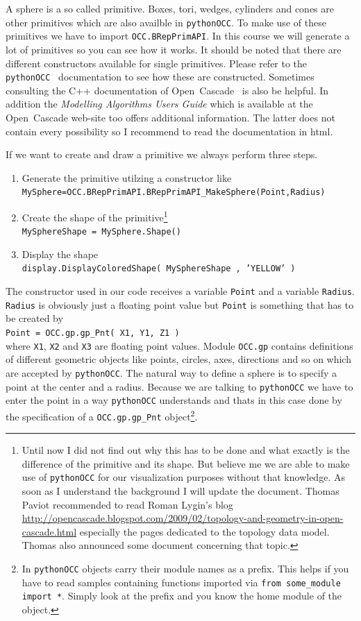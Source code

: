 A sphere is a so called primitive.
Boxes, tori, wedges, cylinders and cones are other primitives which are also availble in {\tt pythonOCC}.
To make use of these primitives we have to import {\tt OCC.BRepPrimAPI}.
In this course we will generate a lot of primitives so you can see how it works.
It should be noted that there are different constructors available for single primitives.
Please refer to the {\tt pythonOCC}~\cite{PYTHON_OCC_DOCU} documentation to see how these are constructed.
Sometimes consulting the C++ documentation of Open~Cascade~\cite{OPENCASCADE_ORG} is also be helpful.
In addition the {\it Modelling Algorithms Users Guide} which is available at the Open~Cascade web-site too offers additional information.
The latter does not contain every possibility so I recommend to read the documentation in html.

If we want to create and draw a primitive we always perform three steps.
\begin{enumerate}
\item Generate the primitive utilzing a constructor like \\ 
		{\tt MySphere=OCC.BRepPrimAPI.BRepPrimAPI\_MakeSphere(Point,Radius)}
\item Create the shape of the primitive\footnote{Until now I did not find out why this has to be done and what exactly is the difference of the primitive and its shape. But believe me we are able to make use of {\tt pythonOCC} for our visualization purposes without that knowledge. As soon as I understand the background I will update the document. Thomas Paviot recommended to read 
Roman Lygin's blog \href{http://opencascade.blogspot.com/2009/02/topology-and-geometry-in-open-cascade.html}{http://opencascade.blogspot.com/2009/02/topology-and-geometry-in-open-cascade.html} especially the pages dedicated to the topology data model. Thomas also announced some document concerning that topic.
}\\
		{\tt MySphereShape = MySphere.Shape()}
\item Display the shape\\
		{\tt display.DisplayColoredShape( MySphereShape , 'YELLOW' )}
\end{enumerate}

The constructor used in our code receives a variable {\tt Point} and a variable  {\tt Radius}.
{\tt Radius} is obviously just a floating point value but {\tt Point} is something that has to be created by\\
{\tt Point = OCC.gp.gp\_Pnt( X1, Y1, Z1 ) }\\
where {\tt X1}, {\tt X2} and {\tt X3} are floating point values.
Module {\tt OCC.gp} contains definitions of different geometric objects like points, circles, axes, directions and so on which are accepted by {\tt pythonOCC}.
The natural way to define a sphere is to specify a point at the center and a radius.
Because we are talking to {\tt pythonOCC} we have to enter the point in a way  {\tt pythonOCC} understands and thats in this case done by the specification of a {\tt OCC.gp.gp\_Pnt} object\footnote{In {\tt pythonOCC} objects carry their module names as a prefix. This helps if you have to read samples containing functions imported via {\tt from some\_module import~*}. Simply look at the prefix and you know the home module of the object.}.
%
